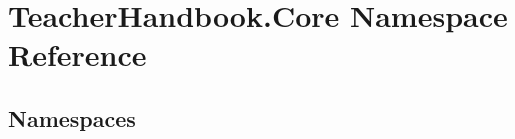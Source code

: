 \hypertarget{namespace_teacher_handbook_1_1_core}{}\section{Teacher\+Handbook.\+Core Namespace Reference}
\label{namespace_teacher_handbook_1_1_core}
\subsection*{Namespaces}
\begin{DoxyCompactItemize}
\end{DoxyCompactItemize}

